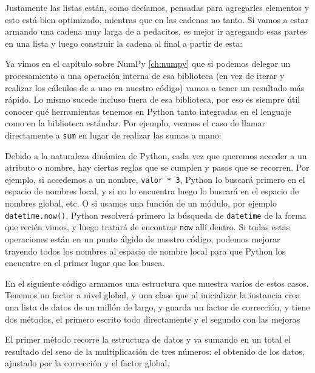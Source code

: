 
Justamente las listas están, como decíamos, pensadas para agregarles elementos y esto está bien optimizado, mientras que en las cadenas no tanto. Si vamos a estar armando una cadena muy larga de a pedacitos, es mejor ir agregando esas partes en una lista y luego construir la cadena al final a partir de esta:


Ya vimos en el capítulo sobre NumPy \ref{ch:numpy} que si podemos delegar un procesamiento a una operación interna de esa biblioteca (en vez de iterar y realizar los cálculos de a uno en nuestro código) vamos a tener un resultado más rápido. Lo mismo sucede incluso fuera de esa biblioteca, por eso es siempre útil conocer qué herramientas tenemos en Python tanto integradas en el lenguaje como en la biblioteca estándar. Por ejemplo, veamos el caso de llamar directamente a \texttt{sum} en lugar de realizar las sumas a mano:


Debido a la naturaleza dinámica de Python, cada vez que queremos acceder a un atributo o nombre, hay ciertas reglas que se cumplen y pasos que se recorren. Por ejemplo, si accedemos a un nombre, \texttt{valor * 3}, Python lo buscará primero en el espacio de nombres local, y si no lo encuentra luego lo buscará en el espacio de nombres global, etc. O si usamos una función de un módulo, por ejemplo \texttt{datetime.now()}, Python resolverá primero la búsqueda de \texttt{datetime} de la forma que recién vimos, y luego tratará de encontrar \texttt{now} allí dentro. Si todas estas operaciones están en un punto álgido de nuestro código, podemos mejorar trayendo todos los nombres al espacio de nombre local para que Python los encuentre en el primer lugar que los busca.

En el siguiente código armamos una estructura que muestra varios de estos casos. Tenemos un factor a nivel global, y una clase que al inicializar la instancia crea una lista de datos de un millón de largo, y guarda un factor de corrección, y tiene dos métodos, el primero escrito todo directamente y el segundo con las mejoras


El primer método recorre la estructura de datos y va sumando en un total el resultado del seno de la multiplicación de tres números: el obtenido de los datos, ajustado por la corrección y el factor global.

